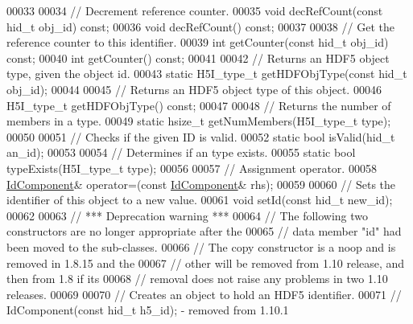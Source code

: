 \begin{DoxyCode}
00033 
00034         \textcolor{comment}{// Decrement reference counter.}
00035         \textcolor{keywordtype}{void} decRefCount(\textcolor{keyword}{const} hid\_t obj\_id) \textcolor{keyword}{const};
00036         \textcolor{keywordtype}{void} decRefCount() \textcolor{keyword}{const};
00037 
00038         \textcolor{comment}{// Get the reference counter to this identifier.}
00039         \textcolor{keywordtype}{int} getCounter(\textcolor{keyword}{const} hid\_t obj\_id) \textcolor{keyword}{const};
00040         \textcolor{keywordtype}{int} getCounter() \textcolor{keyword}{const};
00041 
00042         \textcolor{comment}{// Returns an HDF5 object type, given the object id.}
00043         \textcolor{keyword}{static} H5I\_type\_t getHDFObjType(\textcolor{keyword}{const} hid\_t obj\_id);
00044 
00045         \textcolor{comment}{// Returns an HDF5 object type of this object.}
00046         H5I\_type\_t getHDFObjType() \textcolor{keyword}{const};
00047 
00048         \textcolor{comment}{// Returns the number of members in a type.}
00049         \textcolor{keyword}{static} hsize\_t getNumMembers(H5I\_type\_t type);
00050 
00051         \textcolor{comment}{// Checks if the given ID is valid.}
00052         \textcolor{keyword}{static} \textcolor{keywordtype}{bool} isValid(hid\_t an\_id);
00053 
00054         \textcolor{comment}{// Determines if an type exists.}
00055         \textcolor{keyword}{static} \textcolor{keywordtype}{bool} typeExists(H5I\_type\_t type);
00056 
00057         \textcolor{comment}{// Assignment operator.}
00058         \hyperlink{class_h5_1_1_id_component}{IdComponent}& operator=(\textcolor{keyword}{const} \hyperlink{class_h5_1_1_id_component}{IdComponent}& rhs);
00059 
00060         \textcolor{comment}{// Sets the identifier of this object to a new value.}
00061         \textcolor{keywordtype}{void} setId(\textcolor{keyword}{const} hid\_t new\_id);
00062 
00063         \textcolor{comment}{// *** Deprecation warning ***}
00064         \textcolor{comment}{// The following two constructors are no longer appropriate after the}
00065         \textcolor{comment}{// data member "id" had been moved to the sub-classes.}
00066         \textcolor{comment}{// The copy constructor is a noop and is removed in 1.8.15 and the}
00067         \textcolor{comment}{// other will be removed from 1.10 release, and then from 1.8 if its}
00068         \textcolor{comment}{// removal does not raise any problems in two 1.10 releases.}
00069 
00070         \textcolor{comment}{// Creates an object to hold an HDF5 identifier.}
00071         \textcolor{comment}{// IdComponent(const hid\_t h5\_id); - removed from 1.10.1}

\end{DoxyCode}
